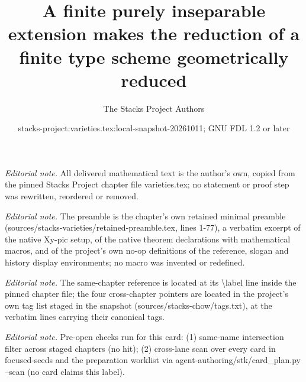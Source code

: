 \documentclass[10pt,a4paper]{amsart}
\title{A finite purely inseparable extension makes the reduction of a finite type scheme geometrically reduced}
\author{The Stacks Project Authors}
\date{stacks-project:varieties.tex:local-snapshot-20261011; GNU FDL 1.2 or later}
\theoremstyle{plain}
\theoremstyle{definition}
\theoremstyle{remark}
\numberwithin{equation}{subsection}
\begin{document}
\maketitle
\noindent\textit{Editorial note.} All delivered mathematical text is the author's own, copied from the pinned Stacks Project chapter file varieties.tex; no statement or proof step was rewritten, reordered or removed.\par\medskip
\noindent\textit{Editorial note.} The preamble is the chapter's own retained minimal preamble (sources/stacks-varieties/retained-preamble.tex, lines 1-77), a verbatim excerpt of the native Xy-pic setup, of the native theorem declarations with mathematical macros, and of the project's own no-op definitions of the reference, slogan and history display environments; no macro was invented or redefined.\par\medskip
\noindent\textit{Editorial note.} The same-chapter reference is located at its \textbackslash{}label line inside the pinned chapter file; the four cross-chapter pointers are located in the project's own tag list staged in the snapshot (sources/stacks-chow/tags.txt), at the verbatim lines carrying their canonical tags.\par\medskip
\noindent\textit{Editorial note.} Pre-open checks run for this card: (1) same-name intersection filter across staged chapters (no hit); (2) cross-lane scan over every card in focused-seeds and the preparation worklist via agent-authoring/stk/card\_plan.py --scan (no card claims this label).\par\medskip
\end{document}
